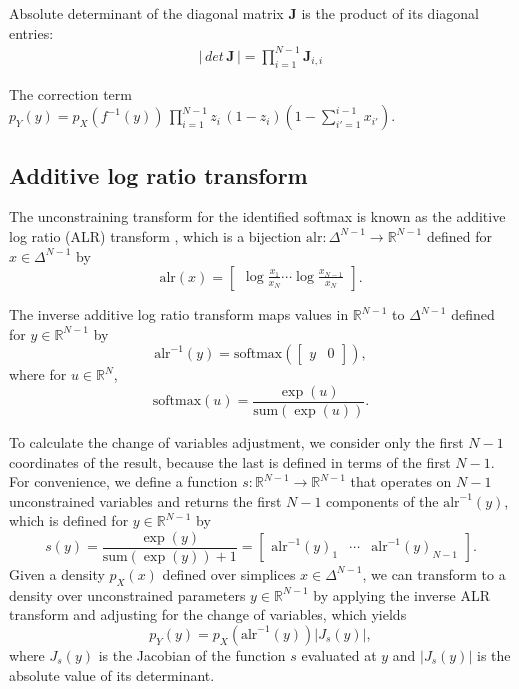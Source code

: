 \documentclass[11pt]{article}
\newcommand{\abs}[1]{\left| #1 \right|}
\newcommand{\absdet}[1]{\abs{#1}}
\begin{document}
Absolute determinant of the diagonal matrix $\mathbf{J}$ is the product of its diagonal entries:
\begin{align*}
	\abs{\, det \, \textbf{J} \,} = \prod_{i=1}^{N-1} \textbf{J}_{i,i}
\end{align*}

The correction term $p_Y(y) = p_X(f^{-1}(y))\,
\prod_{i=1}^{N-1}z_i\,(1 - z_i)\left(1 - \sum_{i'=1}^{i-1} x_{i'}\right).$
\subsection{Additive log ratio transform}

The unconstraining transform for the identified softmax is known as
the additive log ratio (ALR) transform
\cite{aitchison1982statistical}, which is a bijection
$\textrm{alr}:\Delta^{N-1} \rightarrow \mathbb{R}^{N-1}$ defined for
$x \in \Delta^{N-1}$ by
\[
  \textrm{alr}(x)
  = \begin{bmatrix}\displaystyle
    \log \frac{x_1}{x_N} \cdots \log \frac{x_{N-1}}{x_N}
  \end{bmatrix}.
\]

The inverse additive log ratio transform maps values in
$\mathbb{R}^{N-1}$ to $\Delta^{N-1}$ defined for $y \in
\mathbb{R}^{N-1}$ by
\[
  \textrm{alr}^{-1}(y)
  = \textrm{softmax}(\begin{bmatrix} y &  0 \end{bmatrix}),
\]
where for $u \in \mathbb{R}^N$,
\[
  \textrm{softmax}(u) = \frac{\exp(u)}{\textrm{sum}(\exp(u))}.
\]

To calculate the change of variables adjustment, we consider only the
first $N-1$ coordinates of the result, because the last is defined in
terms of the first $N-1$.  For convenience, we define a function 
$s:\mathbb{R}^{N-1} \rightarrow \mathbb{R}^{N-1}$ that operates on
$N-1$ unconstrained variables and returns the first $N-1$ components
of the $\textrm{alr}^{-1}(y)$, which is
defined for $y \in \mathbb{R}^{N-1}$ by
\[
  s(y) = \frac{\exp(y)}{\textrm{sum}(\exp(y)) + 1}
  = \begin{bmatrix}
    \textrm{alr}^{-1}(y)_1
    & \cdots &
    \textrm{alr}^{-1}(y)_{N-1}
    \end{bmatrix}.
\]
Given a density $p_X(x)$ defined over simplices $x \in \Delta^{N-1}$,
we can transform to a density over unconstrained parameters $y \in
\mathbb{R}^{N-1}$ by applying the inverse ALR transform and adjusting
for the change of variables, which yields
\[
  p_Y(y) = p_X(\textrm{alr}^{-1}(y)) \absdet{J_{s}(y)},
\]
where $J_{s}(y)$ is the Jacobian of the function $s$ evaluated at $y$
and $\absdet{J_s(y)}$ is the absolute value of its determinant.
\end{document}
